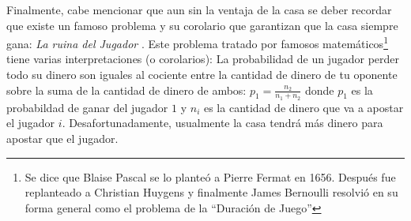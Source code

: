 \begin{table}[ht]
\centering
{}
\caption{Ventajas de la casa para juegos populares de casino \cite{hannum2005practical}}
\label{ventaja-casa}
\end{table}

Finalmente, cabe mencionar que aun sin la ventaja de la casa se deber recordar que existe un famoso problema y su corolario que garantizan que la casa siempre gana: \emph{La ruina del Jugador} \cite[p.~95-99]{ross2006first}. Este problema tratado por famosos matemáticos\footnote{Se dice que Blaise Pascal se lo planteó a Pierre Fermat en 1656. Después fue replanteado a Christian Huygens y finalmente James Bernoulli resolvió en su forma general como el problema de la ``Duración de Juego''} tiene varias interpretaciones (o corolarios): La probabilidad de un jugador perder todo su dinero son iguales al cociente entre la cantidad de dinero de tu oponente sobre la suma de la cantidad de dinero de ambos: $p_1 = \frac{n_2}{n_1 + n_2}$ donde $p_1$ es la probabildad de ganar del jugador $1$ y $n_i$ es la cantidad de dinero que va a apostar el jugador $i$. Desafortunadamente, usualmente  la casa tendrá más dinero para apostar que el jugador.

